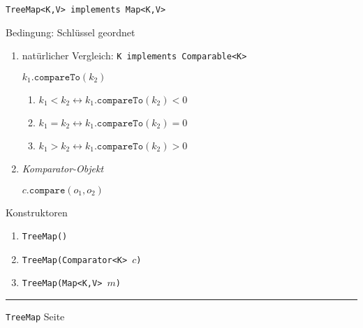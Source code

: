\documentclass{slides}
\newcounter{mypage}
\begin{document}

\begin{slide}{}
\normalsize

\begin{center}
\texttt{TreeMap<K,V> implements Map<K,V>}
\end{center}
\vspace*{0.5cm}

\footnotesize
Bedingung:  Schl\"ussel geordnet
\begin{enumerate}
\item nat\"urlicher Vergleich: \quad \texttt{K implements Comparable<K>}

      \hspace*{1.3cm} $k_1.\mathtt{compareTo}(k_2)$

      \begin{enumerate}
      \item $k_1 < k_2 \leftrightarrow k_1.\mathtt{compareTo}(k_2) < 0$
      \item $k_1 = k_2 \leftrightarrow k_1.\mathtt{compareTo}(k_2) = 0$
      \item $k_1 > k_2 \leftrightarrow k_1.\mathtt{compareTo}(k_2) > 0$
      \end{enumerate}
\item \emph{Komparator-Objekt} 

      $c.\mathtt{compare}(o_1, o_2)$
\end{enumerate}

 Konstruktoren
\begin{enumerate}
\item \texttt{TreeMap()}
\item \texttt{TreeMap(Comparator<K> $c$)}
\item \texttt{TreeMap(Map<K,V> $m$)}
\end{enumerate}


\vspace*{\fill}
\tiny \addtocounter{mypage}{1}
\rule{17cm}{1mm}
\texttt{TreeMap} \hspace*{\fill} Seite 
\end{slide}

\end{document}
